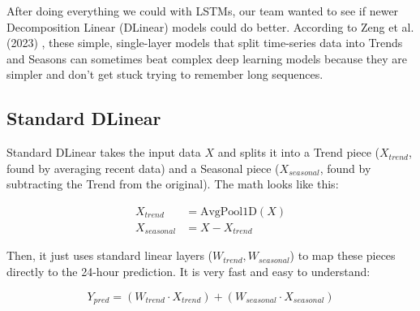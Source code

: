 After doing everything we could with LSTMs, our team wanted to see if newer Decomposition Linear (DLinear) models could do better. According to Zeng et al. (2023) \cite{zeng2023dlinear}, these simple, single-layer models that split time-series data into Trends and Seasons can sometimes beat complex deep learning models because they are simpler and don't get stuck trying to remember long sequences.

\subsection{Standard DLinear}

Standard DLinear takes the input data $X$ and splits it into a Trend piece ($X_{trend}$, found by averaging recent data) and a Seasonal piece ($X_{seasonal}$, found by subtracting the Trend from the original). The math looks like this:

\begin{align}
    X_{trend} &= \text{AvgPool1D}(X) \\
    X_{seasonal} &= X - X_{trend}
\end{align}

Then, it just uses standard linear layers ($W_{trend}, W_{seasonal}$) to map these pieces directly to the 24-hour prediction. It is very fast and easy to understand:

\begin{equation}
    Y_{pred} = (W_{trend} \cdot X_{trend}) + (W_{seasonal} \cdot X_{seasonal})
\end{equation}

